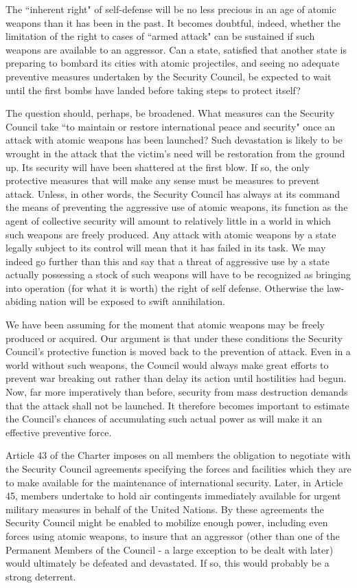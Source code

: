 The ``inherent right" of self-defense will be no less precious in an age of atomic weapons than it has been in the past. It becomes doubtful, indeed, whether the limitation of the right to cases of ``armed attack" can be sustained if such weapons are available to an aggressor. Can a state, satisfied that another state is preparing to bombard its cities with atomic projectiles, and seeing no adequate preventive measures undertaken by the Security Council, be expected to wait until the first bombs have landed before taking steps to protect itself?

The question should, perhaps, be broadened. What measures can the Security Council take ``to maintain or restore international peace and security" once an attack with atomic weapons has been launched? Such devastation is likely to be wrought in the attack that the victim's need will be restoration from the ground up. Its security will have been shattered at the first blow. If so, the only protective measures that will make any sense must be measures to prevent attack. Unless, in other words, the Security Council has always at its command the means of preventing the aggressive use of atomic weapons, its function as the agent of collective security will amount to relatively little in a world in which such weapons are freely produced. Any attack with atomic weapons by a state legally subject to its control will mean that it has failed in its task. We may indeed go further than this and say that a threat of aggressive use by a state actually possessing a stock of such weapons will have to be recognized as bringing into operation (for what it is worth) the right of self defense. Otherwise the law-abiding nation will be exposed to swift annihilation.

We have been assuming for the moment that atomic weapons may be freely produced or acquired. Our argument is that under these conditions the Security Council's protective function is moved back to the prevention of attack. Even in a world without such weapons, the Council would always make great efforts to prevent war breaking out rather than delay its action until hostilities had begun. Now, far more imperatively than before, security from mass destruction demands that the attack shall not be launched. It therefore becomes important to estimate the Council's chances of accumulating such actual power as will make it an effective preventive force.

Article 43 of the Charter imposes on all members the obligation to negotiate with the Security Council agreements specifying the forces and facilities which they are to make available for the maintenance of international security. Later, in Article 45, members undertake to hold air contingents immediately available for urgent military measures in behalf of the United Nations. By these agreements the Security Council might be enabled to mobilize enough power, including even forces using atomic weapons, to insure that an aggressor (other than one of the Permanent Members of the Council - a large exception to be dealt with later) would ultimately be defeated and devastated. If so, this would probably be a strong deterrent.

